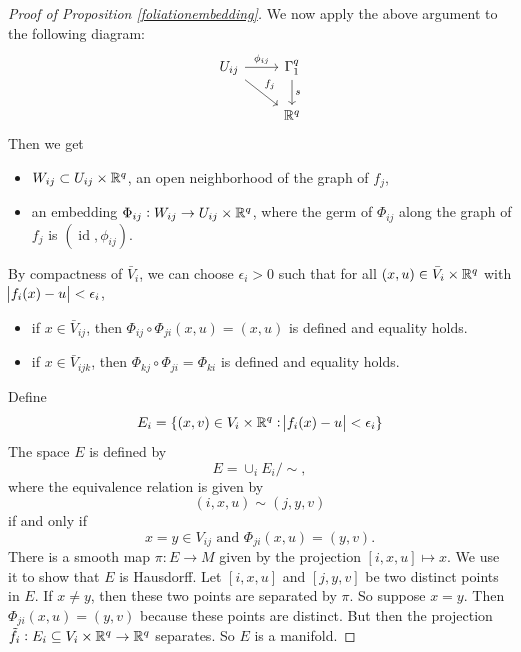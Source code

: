 \documentclass{article}
\newtheorem{proposed work}[theorem]{Proposed Work}
\theoremstyle{definition}
\begin{document}
\begin{proof}[Proof of Proposition \ref{foliationembedding}]
We now apply the above argument to the following diagram:
\begin{equation*}
\begin{tikzcd}
U_{ij} \ar[r,"\phi_{ij}"] \ar[rd,"f_j"] & \Gamma^q_1 \ar[d,"s"] \\
& \R^q
\end{tikzcd}
\end{equation*}
Then we get
\begin{itemize}
\item $W_{ij} \subset U_{ij} \times \mathbb R^q$, an open neighborhood of the
graph of $f_j$,
\item an embedding $\Phi_{ij}: W_{ij} \to U_{ij} \times \mathbb R^q$, where
the germ of $\Phi_{ij}$ along the graph of $f_j$ is
$(\operatorname{id}, \phi_{ij})$.
\end{itemize}

By compactness of $\bar{V}_i$, we can choose $\epsilon_i >0$ such that
for all $(x,u) \in \bar{V}_i \times \mathbb R^q$ with
$\abs{f_i(x)-u} < \epsilon_i$,
\begin{itemize}
\item if $x \in \bar{V}_{ij}$, then
$\Phi_{ij}\circ \Phi_{ji} (x,u) = (x,u)$ is defined and equality
holds.
\item if $x \in \bar{V}_{ijk}$, then
$\Phi_{kj} \circ \Phi_{ji} = \Phi_{ki}$ is defined and equality holds.
\end{itemize}

Define
\begin{equation*}
E_i = \{ (x,v) \in V_i \times \mathbb R^q: \abs{f_i(x)-u} < \epsilon_i\}
\end{equation*}
The space $E$ is defined by
\begin{equation*}
E = \cup_i E_i / \sim,
\end{equation*}
where the equivalence relation is given by
\begin{equation*}
(i,x,u) \sim (j,y,v)
\end{equation*}
if and only if
\begin{equation*}
x = y \in V_{ij} \text{ and } \Phi_{ji}(x,u) = (y,v).
\end{equation*}
There is a smooth map $\pi: E \to M$ given by the projection
$[i,x,u] \mapsto x$. We use it to show that $E$ is Hausdorff. Let
$[i,x,u]$ and $[j,y,v]$ be two distinct points in $E$. If $x \ne y$,
then these two points are separated by $\pi$. So suppose $x=y$. Then
$\Phi_{ji}(x,u) = (y,v)$ because these points are distinct. But then
the projection $\tilde{f}_i: E_i \subseteq V_i\times \mathbb R^q \to \mathbb R^q$
separates. So $E$ is a manifold.


\end{proof}
\end{document}
